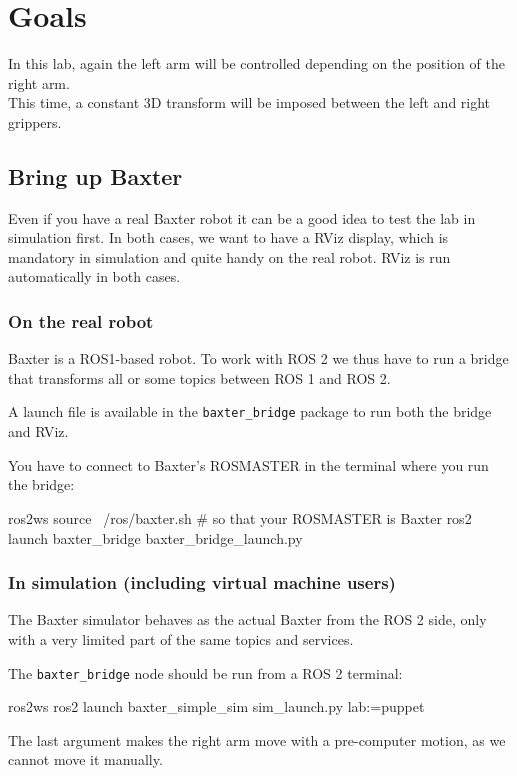 \documentclass{ecnreport}
\author{O. Kermorgant}
\begin{document}


\section{Goals}

In this lab, again the left arm will be controlled depending on the position of the right arm.\\
This time, a constant 3D transform will be imposed between the left and right grippers. 

\subsection{Bring up Baxter}

Even if you have a real Baxter robot it can be a good idea to test the lab in simulation first.
In both cases, we want to have a RViz display, which is mandatory in simulation and quite handy on the real robot. RViz is run automatically in both cases.

\subsubsection{On the real robot}

Baxter is a ROS1-based robot. To work with ROS 2 we thus have to run a bridge that transforms all or some topics between ROS 1 and ROS 2.

A launch file is available in the \texttt{baxter\_bridge} package to run both the bridge and RViz.

You have to connect to Baxter's ROSMASTER in the terminal where you run the bridge:
\begin{bashcodelarge}
 ros2ws
 source ~/ros/baxter.sh # so that your ROSMASTER is Baxter
 ros2 launch baxter_bridge baxter_bridge_launch.py
\end{bashcodelarge}

\subsubsection{In simulation (including virtual machine users)}

The Baxter simulator behaves as the actual Baxter from the ROS 2 side, only with a very limited part of the same topics and services. 

The \texttt{baxter\_bridge} node should be run from a ROS 2 terminal:
\begin{bashcodelarge}
ros2ws
ros2 launch baxter_simple_sim sim_launch.py lab:=puppet
\end{bashcodelarge}
The last argument makes the right arm move with a pre-computer motion, as we cannot move it manually.
\end{document}
